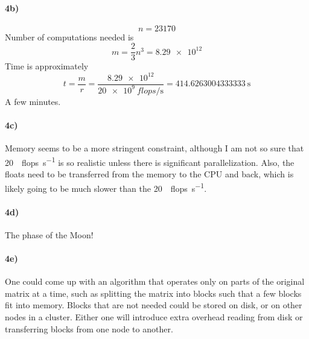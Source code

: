 \documentclass[11pt]{article}
\begin{document}
\paragraph{4b)}
$$ n = 23170 $$
Number of computations needed is
$$ m = \frac{2}{3} n^3 = \num{8.29e12} $$
Time is approximately
$$ t = \frac{m}{r} = \frac{\num{8.29e12}}{\SI{20e9}{flops\per\second}} = \SI{414.6263004333333}{\second} $$
A few minutes.

\paragraph{4c)} Memory seems to be a more stringent constraint, although I am
not so sure that \SI{20}{\giga{}flops\per\second} is so realistic unless there
is significant parallelization. Also, the floats need to be transferred from
the memory to the CPU and back, which is likely going to be much slower than
the \SI{20}{\giga{}flops\per\second}.

\paragraph{4d)} The phase of the Moon!

\paragraph{4e)} One could come up with an algorithm that operates only on parts
of the original matrix at a time, such as splitting the matrix into blocks such
that a few blocks fit into memory. Blocks that are not needed could be stored
on disk, or on other nodes in a cluster. Either one will introduce extra
overhead reading from disk or transferring blocks from one node to another.
\end{document}
